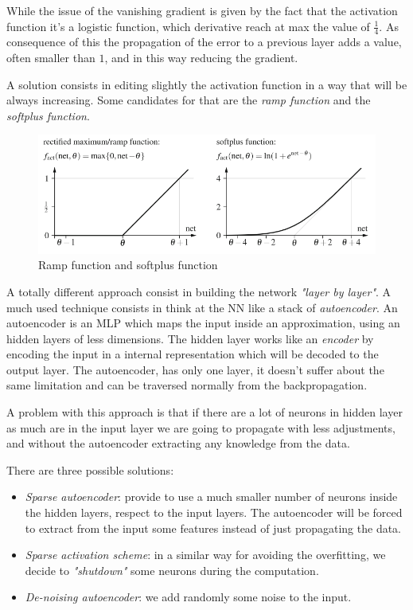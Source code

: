 \documentclass{article}
\begin{document}
While the issue of the vanishing gradient is given by the fact that the activation function it's a
logistic function, which derivative reach at max the value of $\frac{1}{4}$. As consequence of this
the propagation of the error to a previous layer adds a value, often smaller than $1$, and in this
way reducing the gradient.

A solution consists in editing slightly the activation function in a way that will be always increasing.
Some candidates for that are the \textit{ramp function} and the \textit{softplus function}.
\begin{figure}
    \centering
    \includegraphics[scale=0.5]{images/ramp_softplus.png}
    \caption{Ramp function and softplus function}
\end{figure}
A totally different approach consist in building the network \textit{"layer by layer"}. A much used
technique consists in think at the NN like a stack of \textit{autoencoder}. An autoencoder is an MLP
which maps the input inside an approximation, using an hidden layers of less dimensions. The
hidden layer works like an \textit{encoder} by encoding the input in a internal representation
which will be decoded to the output layer. The autoencoder, has only one layer, it doesn't suffer
about the same limitation and can be traversed normally from the backpropagation.

A problem with this approach is that if there are a lot of neurons in hidden layer as much are in
the input layer we are going to propagate with less adjustments, and without the autoencoder
extracting any knowledge from the data.

There are three possible solutions:
\begin{itemize}
    \item \textit{Sparse autoencoder}: provide to use a much smaller number of neurons inside the
          hidden layers, respect to the input layers. The autoencoder will be forced to extract from
          the input some features instead of just propagating the data.

    \item \textit{Sparse activation scheme}: in a similar way for avoiding the overfitting, we
          decide to \textit{"shutdown"} some neurons during the computation.

    \item \textit{De-noising autoencoder}: we add randomly some noise to the input.
\end{itemize}
\end{document}
